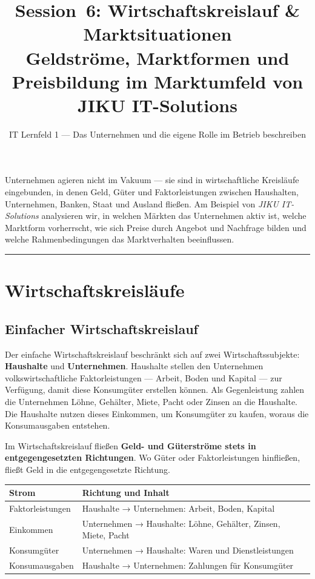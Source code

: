 \documentclass[11pt, a4paper]{article}
\title{\vspace*{-1.5cm}\Huge\bfseries\color{bfwPrimaryDark}Session~6: Wirtschaftskreislauf \& Marktsituationen\\[0.4em]
  \large\color{bfwInkSoft}\textnormal{Geldströme, Marktformen und Preisbildung im Marktumfeld von JIKU IT-Solutions}}
\author{\textsf{IT Lernfeld 1 --- Das Unternehmen und die eigene Rolle im Betrieb beschreiben}}
\date{}
\begin{document}
\maketitle
\thispagestyle{empty}

\vspace{1em}
\begin{merksatz}[title={\bfseries Worum geht es in dieser Session?}]
Unternehmen agieren nicht im Vakuum --- sie sind in wirtschaftliche Kreisläufe eingebunden,
in denen Geld, Güter und Faktorleistungen zwischen Haushalten, Unternehmen, Banken, Staat
und Ausland fließen. Am Beispiel von \emph{JIKU IT-Solutions} analysieren wir, in welchen
Märkten das Unternehmen aktiv ist, welche Marktform vorherrscht, wie sich Preise durch
Angebot und Nachfrage bilden und welche Rahmenbedingungen das Marktverhalten beeinflussen.
\end{merksatz}

\tableofcontents
\vspace{1em}
\hrule
\vspace{1em}

\section{Wirtschaftskreisläufe}

\subsection{Einfacher Wirtschaftskreislauf}

Der einfache Wirtschaftskreislauf beschränkt sich auf zwei Wirtschaftssubjekte: \textbf{Haushalte}
und \textbf{Unternehmen}. Haushalte stellen den Unternehmen volkswirtschaftliche
Faktorleistungen --- Arbeit, Boden und Kapital --- zur Verfügung, damit diese Konsumgüter
erstellen können. Als Gegenleistung zahlen die Unternehmen Löhne, Gehälter, Miete, Pacht
oder Zinsen an die Haushalte. Die Haushalte nutzen dieses Einkommen, um Konsumgüter zu
kaufen, woraus die Konsumausgaben entstehen.

\begin{merksatz}[title={\bfseries Merke: Gegenläufige Ströme}]
Im Wirtschaftskreislauf fließen \textbf{Geld- und Güterströme stets in entgegengesetzten
Richtungen}. Wo Güter oder Faktorleistungen hinfließen, fließt Geld in die entgegengesetzte
Richtung.
\end{merksatz}

\begin{center}
\begin{tabular}{p{3.5cm} p{9.5cm}}
\toprule
\textbf{Strom} & \textbf{Richtung und Inhalt}\\
\midrule
Faktorleistungen & Haushalte → Unternehmen: Arbeit, Boden, Kapital\\
\addlinespace
Einkommen & Unternehmen → Haushalte: Löhne, Gehälter, Zinsen, Miete, Pacht\\
\addlinespace
Konsumgüter & Unternehmen → Haushalte: Waren und Dienstleistungen\\
\addlinespace
Konsumausgaben & Haushalte → Unternehmen: Zahlungen für Konsumgüter\\
\bottomrule
\end{tabular}
\end{center}
\end{document}
